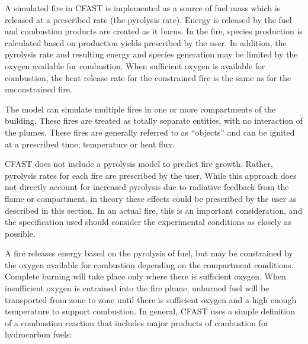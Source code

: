 A simulated fire in CFAST is implemented as a source of fuel mass which is released at a prescribed rate (the pyrolysis rate). Energy is released by the fuel and combustion products are created as it burns. In the fire, species production is calculated based on production yields prescribed by the user. In addition, the pyrolysis rate and resulting energy and species generation may be limited by the oxygen available for combustion. When sufficient oxygen is available for combustion, the heat release rate for the constrained fire is the same as for the unconstrained fire.

The model can simulate multiple fires in one or more compartments of the building.  These fires are treated as totally separate entities, with no interaction of the plumes. These fires are generally referred to as “objects” and can be ignited at a prescribed time, temperature or heat flux.

CFAST does not include a pyrolysis model to predict fire growth. Rather, pyrolysis rates for each fire are prescribed by the user.  While this approach does not directly account for increased pyrolysis due to radiative feedback from the flame or compartment, in theory these effects could be prescribed by the user as described in this section.  In an actual fire, this is an important consideration, and the specification used should consider the experimental conditions as closely as possible.

A fire releases energy based on the pyrolysis of fuel, but may be constrained by the oxygen available for combustion depending on the compartment conditions. Complete burning will take place only where there is sufficient oxygen.  When insufficient oxygen is entrained into the fire plume, unburned fuel will be transported from zone to zone until there is sufficient oxygen and a high enough temperature to support combustion.  In general, CFAST uses a simple definition of a combustion reaction that includes major products of combustion for hydrocarbon fuels:

